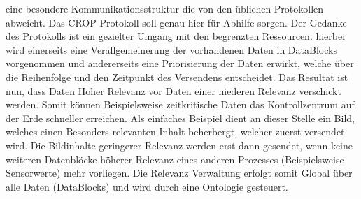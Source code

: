 eine besondere Kommunikationsstruktur die von den {\"u}blichen Protokollen 
abweicht. Das CROP Protokoll soll genau hier f{\"u}r Abhilfe sorgen. 
Der Gedanke des Protokolls ist ein gezielter Umgang mit den begrenzten 
Ressourcen. hierbei wird einerseits eine Verallgemeinerung der vorhandenen 
Daten in DataBlocks vorgenommen und andererseits eine Priorisierung der 
Daten erwirkt, welche {\"u}ber die Reihenfolge und den Zeitpunkt des 
Versendens entscheidet. Das Resultat ist nun, dass Daten Hoher Relevanz 
vor Daten einer niederen Relevanz verschickt werden. Somit k{\"o}nnen 
Beispielsweise zeitkritische Daten das Kontrollzentrum auf der Erde 
schneller erreichen. Als einfaches Beispiel dient an dieser Stelle ein 
Bild, welches einen Besonders relevanten Inhalt beherbergt, welcher 
zuerst versendet wird. Die Bildinhalte geringerer Relevanz werden erst 
dann gesendet, wenn keine weiteren Datenbl{\"o}cke h{\"o}herer Relevanz 
eines anderen Prozesses (Beispielsweise Sensorwerte) mehr vorliegen. Die 
Relevanz Verwaltung erfolgt somit Global {\"u}ber alle Daten (DataBlocks) 
und wird durch eine Ontologie gesteuert.
